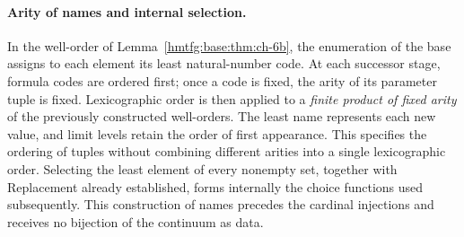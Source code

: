 \paragraph{Arity of names and internal selection.}
In the well-order of Lemma~\ref{hmtfg:base:thm:ch-6b}, the enumeration of the base
assigns to each element its least natural-number code. At each successor
stage, formula codes are ordered first; once a code is fixed, the arity
of its parameter tuple is fixed. Lexicographic order is then applied to a
\emph{finite product of fixed arity} of the previously constructed
well-orders. The least name represents each new value, and limit levels
retain the order of first appearance. This specifies the ordering of
tuples without combining different arities into a single lexicographic
order. Selecting the least element of every nonempty set, together with
Replacement already established, forms internally the choice functions
used subsequently. This construction of names precedes the cardinal
injections and receives no bijection of the continuum as data.
